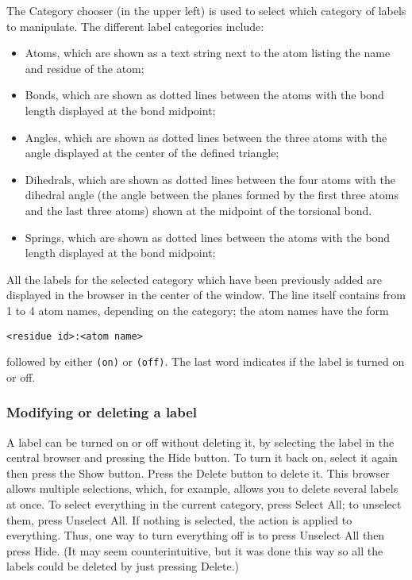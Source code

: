 The {\sf Category} chooser (in the upper left) is used to select which
category of labels to manipulate.  The different label categories include:
\begin{itemize}
  \item Atoms, which are shown as a text string next to the atom listing
the name and residue of the atom;
  \item Bonds, which are shown as dotted lines between the atoms with the
bond length displayed at the bond midpoint;
  \item Angles, which are shown as dotted lines between the three atoms with
the angle displayed at the center of the defined triangle;
  \item Dihedrals, which are shown as dotted lines between the four atoms
with the dihedral angle (the angle between the planes formed by the first
three atoms and the last three atoms) shown at the midpoint of the 
torsional bond.
  \item Springs, which are shown as dotted lines between the atoms with the
bond length displayed at the bond midpoint;
\end{itemize}
All the labels for the selected category which have been previously
added are displayed in the browser in the center of the window.  The
line itself contains from 1 to 4 atom names, depending on the
category; the atom names have the form
\begin{centering}
{\tt <residue name><residue id>:<atom name>}
\end{centering}
followed by either {\tt (on)} or {\tt (off)}.  The last word
indicates if the label is turned on or off.


\subsubsection{Modifying or deleting a label} 

A label can be turned on or off without deleting it, by selecting the
label in the central browser and pressing the {\sf Hide} button.  To
turn it back on, select it again then press the {\sf Show} button.
Press the {\sf Delete} button to delete it.  This browser allows
multiple selections, which, for example, allows you to delete several
labels at once.  To select everything in the current category, press
{\sf Select All}; to unselect them, press {\sf Unselect All}.  If
nothing is selected, the action is applied to everything.  Thus, one
way to turn everything off is to press {\sf Unselect All} then press
{\sf Hide}.  (It may seem counterintuitive, but it was done this way
so all the labels could be deleted by just pressing {\sf Delete}.)


